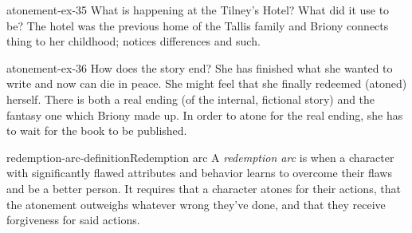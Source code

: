 \documentclass[preview]{standalone}
\begin{document}
\begin{snippetexercise}{atonement-ex-35}
    {What is happening at the Tilney's Hotel? What did it use to be?}
    The hotel was the previous home of the Tallis family
    and Briony connects thing to her childhood; notices differences and such.
\end{snippetexercise}

\begin{snippetexercise}{atonement-ex-36}
    {How does the story end?}
    She has finished what she wanted to write and now can die in peace.
    She might feel that she finally redeemed (atoned) herself.
    There is both a real ending (of the internal, fictional story)
    and the fantasy one which Briony made up.
    In order to atone for the real ending, she has to wait for the book to be published.
\end{snippetexercise}

\begin{snippetdefinition}{redemption-arc-definition}{Redemption arc}
    A \textit{redemption arc} is when a character with significantly flawed attributes and behavior learns to overcome their flaws and be a better person.
    It requires that a character atones for their actions, that the atonement outweighs whatever wrong they've done, and that they receive forgiveness for said actions.
\end{snippetdefinition}
\end{document}
